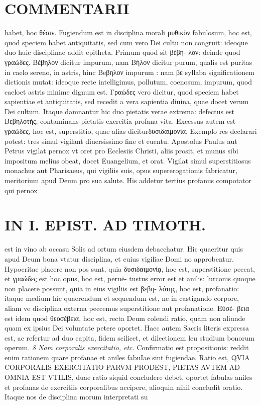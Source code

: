\documentclass{article}
\begin{document}
\begin{pages}
\section*{COMMENTARII }
\marginpar{[ p.96 ]}\pstart habet, hoc θέσιν. Fugiendum est in disciplina morali μυθικὸν fabulosum, hoc est, quod speciem habet antiquitatis, sed cum vero Dei cultu non congruit: ideoque duo huic disciplinae addit epitheta. Primum quod sit βέβη- λον: deinde quod γραώδες. Βέβηλον dicitur impurum, nam Βήλον dicitur purum, qualis est puritas in caelo sereno, in astris, hinc Beβηλον impurum : nam βε syllaba significationem dictionis mutat: ideoque recte intelligimus, pollutum, coenosum, impurum, quod caeloet astris minime dignum est. Γραώδες vero dicitur, quod speciem habet sapientiae et antiquitatis, sed recedit a vera sapientia diuina, quae docet verum Dei cultum.  \pend\pstart Itaque damnantur hic duo pietatis verae extrema: defectus est Bεβηλοτὴς, contaminans pietatis exercitia profana vita. Excessus autem est γραώδες, hoc est, superstitio, quae alias diciturδυσιδαιμονία. Exemplo res declarari potest: tres simul vigilant diuersissimo fine et euentu. Apostolus Paulus aut Petrus vigilat pernox vt oret pro Ecclesiis Christi, aliis prosit, et munus sibi impositum melius obeat, docet Euangelium, et orat. Vigilat simul superstitiosus monachus aut Pharisaeus, qui vigiliis suis, opus supererogationis fabricatur, meritorium apud Deum pro sua salute. His addetur tertius profanus compotator qui pernox\pend
\section*{IN I. EPIST. AD TIMOTH. }
\marginpar{[ p.97 ]}
\marginpar{[ p.G ]}\pstart est in vino ab occasu Solis ad ortum eiusdem debacchatur. Hic quaeritur quis apud Deum bona vtatur disciplina, et cuius vigiliae Domi no approbentur. Hypocritae placere non pos sunt, quia δυσιδαιμονίᾳ, hoc est, superstitione peccat, et γραώδες est hoc opus, hoc est, peruë- tustus error est et anilis: lurconis quoque non placere possunt, quia in eius vigiliis est βεβη- λότης, hoc est, profanatio: itaque medium hîc quaerendum et sequendum est, ne in castigando corpore, aliam ve disciplina externa peccemus superstitione aut profanatione. Εὐσέ- βεια est idem quod θεοσέβεια, hoc est, recta Deum colendi ratio, quam non aliunde quam ex ipsius Dei voluntate petere oportet. Haec autem Sacris literis expressa est, ac refertur ad duo capita, fidem scilicet, et dilectionem leu studium bonorum operum.  \pend
\textit{8 Nam corporalis exercitatio, etc. }\pstart Confirmatio est propositionis: reddit enim rationem quare profanae et aniles fabuIae sint fugiendae. Ratio est, QVIA CORPORALIS EXERCITATIO PARVM PRODEST, PIETAS AVTEM AD OMNIA EST VTILIS, duae ratio siquid concludere debet, oportet fabulas aniles et profanas de exercitiis corporalibus accipere, alioquin nihil concludit oratio. Itaque nos de disciplina morum interpretati su\pend

\end{pages}
\end{document}
